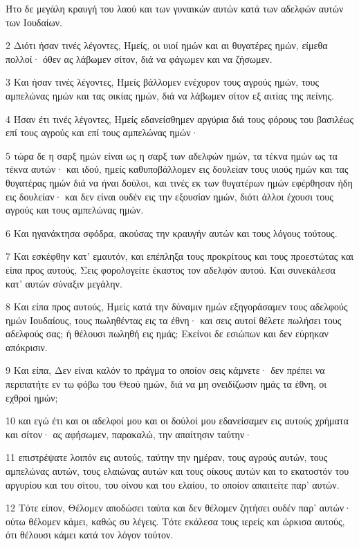 \par Ήτο δε μεγάλη κραυγή του λαού και των γυναικών αυτών κατά των αδελφών αυτών των Ιουδαίων.
\par 2 Διότι ήσαν τινές λέγοντες, Ημείς, οι υιοί ημών και αι θυγατέρες ημών, είμεθα πολλοί· όθεν ας λάβωμεν σίτον, διά να φάγωμεν και να ζήσωμεν.
\par 3 Και ήσαν τινές λέγοντες, Ημείς βάλλομεν ενέχυρον τους αγρούς ημών, τους αμπελώνας ημών και τας οικίας ημών, διά να λάβωμεν σίτον εξ αιτίας της πείνης.
\par 4 Ήσαν έτι τινές λέγοντες, Ημείς εδανείσθημεν αργύρια διά τους φόρους του βασιλέως επί τους αγρούς και επί τους αμπελώνας ημών·
\par 5 τώρα δε η σαρξ ημών είναι ως η σαρξ των αδελφών ημών, τα τέκνα ημών ως τα τέκνα αυτών· και ιδού, ημείς καθυποβάλλομεν εις δουλείαν τους υιούς ημών και τας θυγατέρας ημών διά να ήναι δούλοι, και τινές εκ των θυγατέρων ημών εφέρθησαν ήδη εις δουλείαν· και δεν είναι ουδέν εις την εξουσίαν ημών, διότι άλλοι έχουσι τους αγρούς και τους αμπελώνας ημών.
\par 6 Και ηγανάκτησα σφόδρα, ακούσας την κραυγήν αυτών και τους λόγους τούτους.
\par 7 Και εσκέφθην κατ' εμαυτόν, και επέπληξα τους προκρίτους και τους προεστώτας και είπα προς αυτούς, Σεις φορολογείτε έκαστος τον αδελφόν αυτού. Και συνεκάλεσα κατ' αυτών σύναξιν μεγάλην.
\par 8 Και είπα προς αυτούς, Ημείς κατά την δύναμιν ημών εξηγοράσαμεν τους αδελφούς ημών Ιουδαίους, τους πωληθέντας εις τα έθνη· και σεις αυτοί θέλετε πωλήσει τους αδελφούς σας; ή θέλουσι πωληθή εις ημάς; Εκείνοι δε εσιώπων και δεν εύρηκαν απόκρισιν.
\par 9 Και είπα, Δεν είναι καλόν το πράγμα το οποίον σεις κάμνετε· δεν πρέπει να περιπατήτε εν τω φόβω του Θεού ημών, διά να μη ονειδίζωσιν ημάς τα έθνη, οι εχθροί ημών;
\par 10 και εγώ έτι και οι αδελφοί μου και οι δούλοί μου εδανείσαμεν εις αυτούς χρήματα και σίτον· ας αφήσωμεν, παρακαλώ, την απαίτησιν ταύτην·
\par 11 επιστρέψατε λοιπόν εις αυτούς, ταύτην την ημέραν, τους αγρούς αυτών, τους αμπελώνας αυτών, τους ελαιώνας αυτών και τους οίκους αυτών και το εκατοστόν του αργυρίου και του σίτου, του οίνου και του ελαίου, το οποίον απαιτείτε παρ' αυτών.
\par 12 Τότε είπον, Θέλομεν αποδώσει ταύτα και δεν θέλομεν ζητήσει ουδέν παρ' αυτών· ούτω θέλομεν κάμει, καθώς συ λέγεις. Τότε εκάλεσα τους ιερείς και ώρκισα αυτούς, ότι θέλουσι κάμει κατά τον λόγον τούτον.
